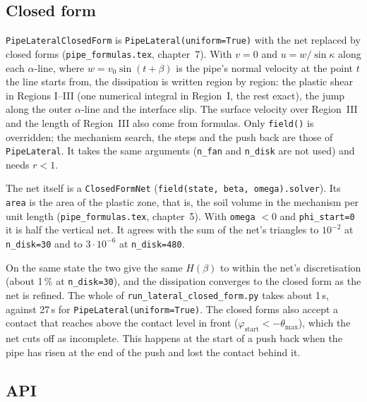 \documentclass[11pt,a4paper]{article}
\begin{document}
\subsection{Closed form}
\label{sec:lateral_cf}

\texttt{PipeLateralClosedForm} is \texttt{PipeLateral(uniform=True)}
with the net replaced by closed forms (\texttt{pipe\_formulas.tex},
chapter~7).  With $v = 0$ and $u = w/\sin\kappa$ along each
$\alpha$-line, where $w = v_0\sin(t + \beta)$ is the pipe's normal
velocity at the point $t$ the line starts from, the dissipation is
written region by region: the plastic shear in Regions I--III
(one numerical integral in Region~I, the rest exact), the jump along
the outer $\alpha$-line and the interface slip.  The surface velocity
over Region~III and the length of Region~III also come from formulas.
Only \texttt{field()} is overridden; the mechanism search, the steps and
the push back are those of \texttt{PipeLateral}.  It takes the same
arguments (\texttt{n\_fan} and \texttt{n\_disk} are not used) and
needs $r < 1$.

The net itself is a \texttt{ClosedFormNet}
(\texttt{field(state, beta, omega).solver}).  Its \texttt{area} is the
area of the plastic zone, that is, the soil volume in the mechanism per
unit length (\texttt{pipe\_formulas.tex}, chapter~5).  With
\texttt{omega} $< 0$ and \texttt{phi\_start=0} it is half the vertical
net.  It agrees with the sum of the net's triangles to $10^{-2}$ at
\texttt{n\_disk=30} and to $3\cdot10^{-6}$ at \texttt{n\_disk=480}.

On the same state the two give the same $H(\beta)$ to within the net's
discretisation (about 1\,\% at \texttt{n\_disk=30}), and the
dissipation converges to the closed form as the net is refined.  The
whole of \texttt{run\_lateral\_closed\_form.py} takes about 1\,s,
against 27\,s for \texttt{PipeLateral(uniform=True)}.  The closed
forms also accept a contact that reaches above the contact level in
front ($\varphi_\text{start} < -\theta_\text{max}$), which the net cuts off
as incomplete.  This happens at the start of a push back when the pipe
has risen at the end of the push and lost the contact behind it.

\subsection{API}
\end{document}
